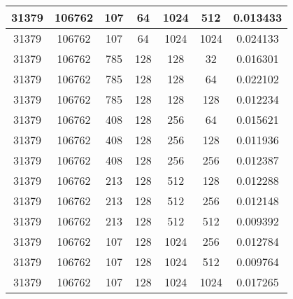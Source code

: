 \documentclass[9pt]{article}
\begin{document}
\begin{tabular}{|c|c|c|c|c|c|c| }
\hline
31379  & 106762  & 107  & 64  & 1024  & 512  & 0.013433 \\
\hline
31379  & 106762  & 107  & 64  & 1024  & 1024  & 0.024133 \\
\hline
31379  & 106762  & 785  & 128  & 128  & 32  & 0.016301 \\
\hline
31379  & 106762  & 785  & 128  & 128  & 64  & 0.022102 \\
\hline
31379  & 106762  & 785  & 128  & 128  & 128  & 0.012234 \\
\hline
31379  & 106762  & 408  & 128  & 256  & 64  & 0.015621 \\
\hline
31379  & 106762  & 408  & 128  & 256  & 128  & 0.011936 \\
\hline
31379  & 106762  & 408  & 128  & 256  & 256  & 0.012387 \\
\hline
31379  & 106762  & 213  & 128  & 512  & 128  & 0.012288 \\
\hline
31379  & 106762  & 213  & 128  & 512  & 256  & 0.012148 \\
\hline
31379  & 106762  & 213  & 128  & 512  & 512  & 0.009392 \\
\hline
31379  & 106762  & 107  & 128  & 1024  & 256  & 0.012784 \\
\hline
31379  & 106762  & 107  & 128  & 1024  & 512  & 0.009764 \\
\hline
31379  & 106762  & 107  & 128  & 1024  & 1024  & 0.017265 \\
\hline
\end{tabular}
 
\end{document}
